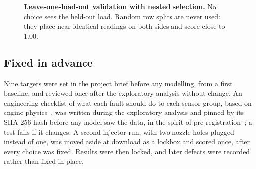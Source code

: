 \documentclass[10pt]{article}
\begin{document}
\begin{figure}[!htbp]
\centering
{}
\caption{\textbf{Leave-one-load-out validation with nested selection.} No choice sees the held-out load. Random row splits are never used: they place near-identical readings on both sides and score close to 1.00.}
\label{fig:lolo}
\end{figure}

\subsection{Fixed in advance}

Nine targets were set in the project brief before any modelling, from a first baseline, and reviewed once after the exploratory analysis without change. An engineering checklist of what each fault should do to each sensor group, based on engine physics~\cite{heywood1988}, was written during the exploratory analysis and pinned by its SHA-256 hash before any model saw the data, in the spirit of pre-registration~\cite{nosek2018prereg}; a test fails if it changes. A second injector run, with two nozzle holes plugged instead of one, was moved aside at download as a lockbox and scored once, after every choice was fixed. Results were then locked, and later defects were recorded rather than fixed in place.
\end{document}
